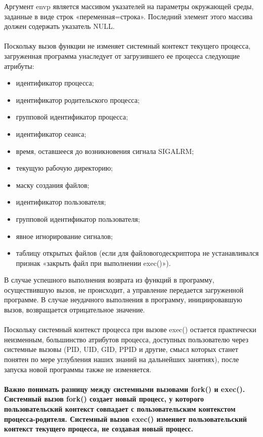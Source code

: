 \documentclass[a4paper]{article}
\begin{document}
Аргумент envp является массивом указателей на параметры окружающей среды, заданные в виде строк «переменная=строка». Последний элемент этого массива должен содержать указатель NULL. \\\\
Поскольку вызов функции не изменяет системный контекст текущего процесса, загруженная программа унаследует от загрузившего ее процесса следующие атрибуты:
\begin{itemize}
  \item идентификатор процесса;
  \item идентификатор родительского процесса;
  \item групповой идентификатор процесса;
  \item идентификатор сеанса;
  \item время, оставшееся до возникновения сигнала SIGALRM;
  \item текущую рабочую директорию;
  \item маску создания файлов;
  \item идентификатор пользователя;
  \item групповой идентификатор пользователя;
  \item явное игнорирование сигналов;
  \item таблицу открытых файлов (если для файловогодескриптора не устанавливался признак «закрыть файл при выполнении exec()»).
\end{itemize}
В случае успешного выполнения возврата из функций в программу, осуществившую вызов, не происходит, а управление передается загруженной программе. В случае неудачного выполнения в программу, инициировавшую вызов, возвращается отрицательное значение. \\\\
Поскольку системный контекст процесса при вызове exec() остается практически неизменным, большинство атрибутов процесса, доступных пользователю через системные вызовы (PID, UID, GID, PPID и другие, смысл которых станет понятен по мере углубления наших знаний на дальнейших занятиях), после запуска новой программы также не изменяется.\\\\
\bf Важно понимать разницу между системными вызовами fork() и exec(). Системный вызов fork() создает новый процесс, у которого пользовательский контекст совпадает с пользовательским контекстом процесса-родителя. Системный вызов exec() изменяет пользовательский контекст текущего процесса, не создавая новый процесс.
\end{document}

